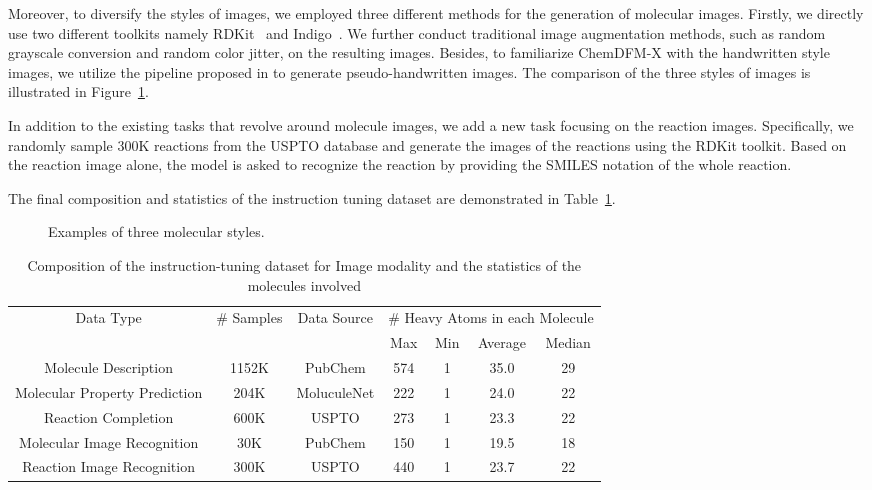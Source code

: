 Moreover, to diversify the styles of images, we employed three different methods for the generation of molecular images. Firstly, we directly use two different toolkits namely RDKit~\cite{rdkit} and Indigo~\cite{indigo}. We further conduct traditional image augmentation methods, such as random grayscale conversion and random color jitter, on the resulting images. Besides, to familiarize ChemDFM-X with the handwritten style images, we utilize the pipeline proposed in \cite{chempix} to generate pseudo-handwritten images. The comparison of the three styles of images is illustrated in Figure~\ref{figure:styles}.

In addition to the existing tasks that revolve around molecule images, we add a new task focusing on the reaction images. Specifically, we randomly sample 300K reactions from the USPTO database and generate the images of the reactions using the RDKit toolkit. Based on the reaction image alone, the model is asked to recognize the reaction by providing the SMILES notation of the whole reaction.

The final composition and statistics of the instruction tuning dataset are demonstrated in Table~\ref{tab:dataim}.

\begin{figure}[!t]
	\centering
	\caption{Examples of three molecular styles.}
	\label{figure:styles}
\end{figure}

\begin{table}
    \centering
    \begin{tabular}{ccccccc}
    \toprule
        \multirow{2}{*}{Data Type} & \multirow{2}{*}{\# Samples} & \multirow{2}{*}{Data Source} & \multicolumn{4}{c}{\# Heavy Atoms in each Molecule} \\
        & & & Max & Min & Average & Median \\
    \midrule
        Molecule Description & 1152K & PubChem & 574 & 1 & 35.0 & 29 \\
        Molecular Property Prediction & 204K & MoluculeNet & 222 & 1 & 24.0 & 22 \\
        Reaction Completion & 600K & USPTO & 273 & 1 & 23.3 & 22 \\
        Molecular Image Recognition & 30K & PubChem & 150 & 1 & 19.5 & 18 \\
        Reaction Image Recognition & 300K & USPTO & 440 & 1 & 23.7 & 22 \\
    \bottomrule
    \end{tabular}
    \caption{Composition of the instruction-tuning dataset for Image modality and the statistics of the molecules involved}
    \label{tab:dataim}
\end{table}


